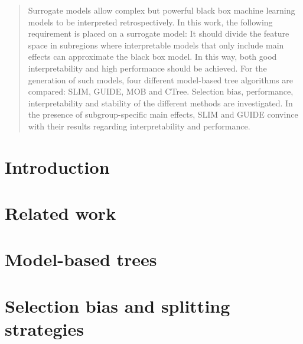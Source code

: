 \documentclass[12pt]{article}
\begin{document}
\begin{abstract}

Surrogate models allow complex but powerful black box machine learning models to be interpreted retrospectively. In this work, the following requirement is placed on a surrogate model: It should divide the feature space in subregions where interpretable models that only include main effects can approximate the black box model. In this way, both good interpretability and high performance should be achieved. For the generation of such models, four different model-based tree algorithms  are compared: SLIM, GUIDE, MOB and CTree. Selection bias, performance, interpretability and stability of the different methods are investigated. In the presence of subgroup-specific main effects, SLIM and GUIDE convince with their results regarding interpretability and performance.

\end{abstract}

\newpage
\tableofcontents

\newpage


    
\section{Introduction}
\label{intro}

\newpage

\section{Related work}
\label{related}

\newpage

\section{Model-based trees}
\label{background}

\newpage

\section{Selection bias and splitting strategies}
\label{selection}

\newpage
\end{document}

